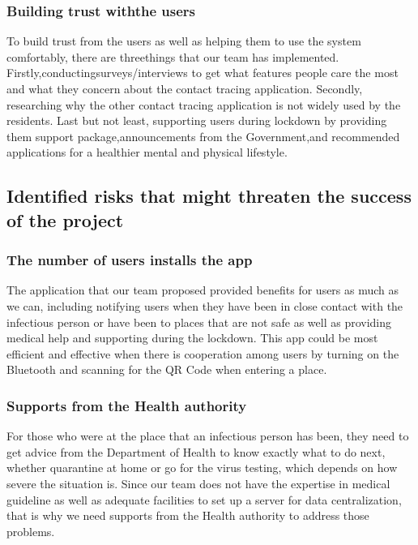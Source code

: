     \subsubsection{Building trust withthe users}
      \par To build trust from the users as well as helping them to use the system comfortably, there are threethings  that  our  team  has implemented.  Firstly,conductingsurveys/interviews  to  get what features people care the most and what they concern about the contact tracing application. Secondly, researching why the other  contact  tracing  application  is  not  widely  used  by the residents.  Last  but  not  least, supporting users  during  lockdown  by providing  them support package,announcements  from  the  Government,and  recommended  applications for  a healthier mental and physical lifestyle.

  \subsection{Identified  risks  that  might  threaten  the  success  of  the project}
    \subsubsection{The number of users installs the app}
      \par The application that our team proposed provided benefits for users as much as we can, including notifying users when they have been in close contact with the infectious person or have been to places that are not safe as well as providing medical help and supporting during the lockdown. This app could be most efficient and effective when there is cooperation among users by turning on the Bluetooth and scanning for the QR Code when entering a place.

    \subsubsection{Supports from the Health authority}
      \par For those who were at the place that an infectious person has been, they need to get advice from the Department of Health to know exactly what to do next, whether quarantine at home or go for the virus testing, which depends on how severe the situation is. Since our team does not have the expertise  in  medical  guideline as  well  as  adequate  facilities  to  set  up  a  server  for  data centralization, that is why we need supports from the Health authority to address those problems.

